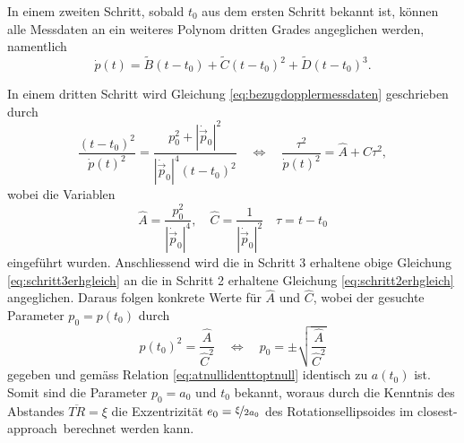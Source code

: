 \documentclass[a4paper,12pt]{article}
\numberwithin{equation}{section}
\begin{document}
In einem zweiten Schritt, sobald $t_0$ aus dem ersten Schritt bekannt ist, können alle Messdaten an ein weiteres Polynom dritten Grades angeglichen werden, namentlich \begin{equation}\label{eq:schritt2erhgleich}
\dot{p}(t) = \tilde{B}(t-t_0) + \tilde{C}(t-t_0)^2 + \tilde{D}(t-t_0)^3.
\end{equation}

In einem dritten Schritt wird Gleichung \eqref{eq:bezugdopplermessdaten} geschrieben durch \begin{equation}\label{eq:schritt3erhgleich}
\frac{(t-t_0)^2}{\dot{p}(t)^2} = \frac{p_0^2+|\dot{\vec{p}}_0|^2}{|\dot{\vec{p}}_0|^4(t-t_0)^2} \quad \Leftrightarrow \quad \frac{\tau^2}{\dot{p}(t)^2} = \hat{A} + \hat{C}\tau^2,
\end{equation} wobei die Variablen \begin{equation}
\hat{A} = \frac{p_0^2}{|\dot{\vec{p}}_0|^4}, \quad \hat{C} = \frac{1}{|\dot{\vec{p}}_0|^2} \quad \tau = t-t_0
\end{equation} eingeführt wurden. Anschliessend wird die in Schritt 3 erhaltene obige Gleichung \eqref{eq:schritt3erhgleich} an die in Schritt 2 erhaltene Gleichung \eqref{eq:schritt2erhgleich} angeglichen. Daraus folgen konkrete Werte für $\hat{A}$ und $\hat{C}$, wobei der gesuchte Parameter $p_0 = p(t_0)$ durch \begin{equation}
p(t_0)^2 = \frac{\hat{A}}{\hat{C}^2} \quad \Leftrightarrow \quad p_0 = \pm \sqrt{\frac{\hat{A}}{\hat{C}^2}}
\end{equation} gegeben und gemäss Relation \eqref{eq:atnullidenttoptnull} identisch zu $a(t_0)$ ist. Somit sind die Parameter $p_0 = a_0$ und $t_0$ bekannt, woraus durch die Kenntnis des Abstandes $\overline{TR} = \xi$ die Exzentrizität $e_0 = \nicefrac{\xi}{2a_0}$ des Rotationsellipsoides im \flqq closest-approach\frqq\ berechnet werden kann.
\end{document}
